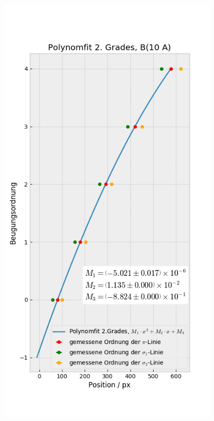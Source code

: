 \begin{landscape}
\begin{figure}
            \includegraphics[width=.45\paperwidth]{Auswertung/scatterorder/sco_10A}

\end{figure}
\end{landscape}
